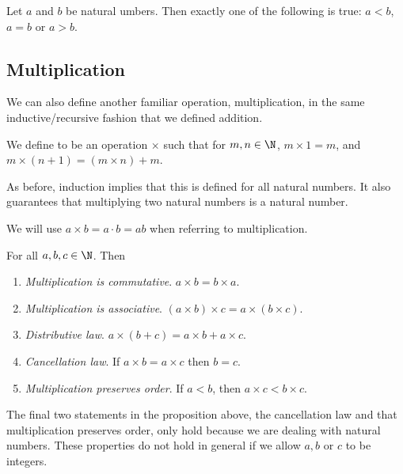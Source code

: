 \documentclass[a4paper]{scrreprt}
\begin{document}
\begin{proposition}[Trichotomy]
	Let $a$ and $b$ be natural umbers. Then exactly one of the following is true: $a < b$, $a = b$ or $a > b$.
\end{proposition}

\subsection{Multiplication}

We can also define another familiar operation, multiplication, in the same inductive/recursive fashion that we defined addition.

\begin{definition}[Multiplication]
	We define  to be an operation $\times$ such that for $m, n \in \N$, $m \times 1 = m$, and $m \times (n + 1) = (m \times n) + m$.
\end{definition}
As before, induction implies that this is defined for all natural numbers. It also guarantees that multiplying two natural numbers is a natural number.

\begin{notation}
We will use $a \times b = a\cdot b = ab$ when referring to multiplication.
\end{notation}

\begin{proposition}
	For all $a, b, c \in \N$. Then
	\begin{enumerate}[label=(\roman*)]
		\item \emph{Multiplication is commutative}. $a \times b = b \times a$.
		\item \emph{Multiplication is associative}. $(a \times b) \times c = a \times (b \times c)$.
		\item \emph{Distributive law}. $a \times(b + c) = a \times b + a \times c$. 
		\item \emph{Cancellation law}. If $a\times b = a\times c$ then $b = c$.
		\item \emph{Multiplication preserves order}. If $a < b$, then $a\times c < b \times c$.
	\end{enumerate}
\end{proposition}
\begin{remark}
	The final two statements in the proposition above, the cancellation law and that multiplication preserves order, only hold because we are dealing with natural numbers. These properties do not hold in general if we allow $a, b$ or $c$ to be integers.
\end{remark}
\end{document}
